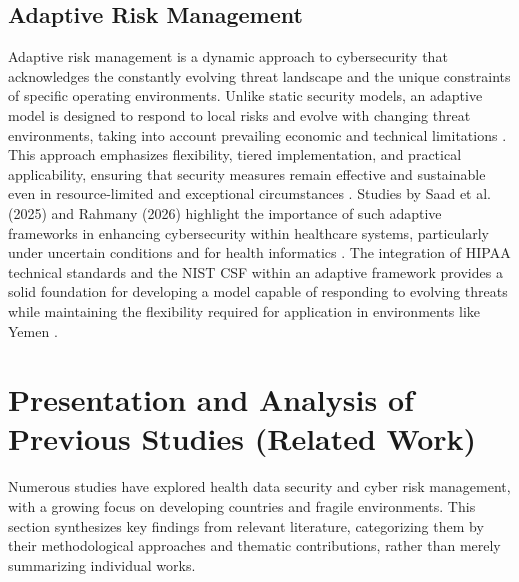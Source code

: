 \documentclass[12pt, a4paper, oneside]{report}
\begin{document}
	\subsection{Adaptive Risk Management}
	Adaptive risk management is a dynamic approach to cybersecurity that acknowledges the constantly evolving threat landscape and the unique constraints of specific operating environments. Unlike static security models, an adaptive model is designed to respond to local risks and evolve with changing threat environments, taking into account prevailing economic and technical limitations \cite{hhs2024hipaa}. This approach emphasizes flexibility, tiered implementation, and practical applicability, ensuring that security measures remain effective and sustainable even in resource-limited and exceptional circumstances \cite{melaku2023context} \cite{nist2024sp80066r2}. Studies by Saad et al. (2025) and Rahmany (2026) highlight the importance of such adaptive frameworks in enhancing cybersecurity within healthcare systems, particularly under uncertain conditions and for health informatics \cite{hasegawa2024cybersecurity} \cite{saad2025fuzzy}. The integration of HIPAA technical standards and the NIST CSF within an adaptive framework provides a solid foundation for developing a model capable of responding to evolving threats while maintaining the flexibility required for application in environments like Yemen \cite{melaku2023context} \cite{nist2024sp80066r2}.
	
	\section{Presentation and Analysis of Previous Studies (Related Work)}
	Numerous studies have explored health data security and cyber risk management, with a growing focus on developing countries and fragile environments. This section synthesizes key findings from relevant literature, categorizing them by their methodological approaches and thematic contributions, rather than merely summarizing individual works.
\end{document}
